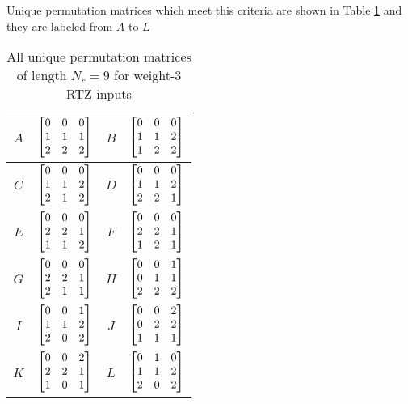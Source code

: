 \documentclass[11pt, oneside, dvipdfmx]{book}
\begin{document}
Unique permutation matrices which meet this criteria are shown in Table \ref{tb2} and they are labeled from $A$ to $L$

\begin{table}[h!]
\centering
\begin{tabular}{|c || c  |c  ||c  |} 
 \hline
 $A$ & $\begin{bmatrix} 0 & 0 & 0 \cr 1 & 1 & 1 \cr 2 & 2 & 2\end{bmatrix}$ 
  &
 $B$ & $\begin{bmatrix}0 & 0 & 0 \cr 1 & 1 & 2 \cr 1 & 2 & 2\end{bmatrix}$\\ 
 \hline
$C$ & $\begin{bmatrix}0 & 0 & 0 \cr 1 & 1 & 2 \cr 2 & 1 & 2\end{bmatrix}$ 
 &
$D$ & $\begin{bmatrix}0 & 0 & 0 \cr 1 & 1 & 2 \cr 2 & 2 & 1\end{bmatrix}$\\ 
 \hline
 $E$ & $\begin{bmatrix}0 & 0 & 0 \cr 2 & 2 & 1 \cr 1 & 1 & 2\end{bmatrix}$ 
 &
 $F$ & $\begin{bmatrix}0 & 0 & 0 \cr 2 & 2 & 1 \cr 1 & 2 & 1\end{bmatrix}$\\ 
 \hline
 $G$ & $\begin{bmatrix}0 & 0 & 0 \cr 2 & 2 & 1 \cr 2 & 1 & 1\end{bmatrix}$ 
 &
  $H$ & $\begin{bmatrix}0 & 0 & 1 \cr 0 & 1 & 1 \cr 2 & 2 & 2\end{bmatrix}$\\ 
 \hline
  $I$ & $\begin{bmatrix}0 & 0 & 1 \cr 1 & 1 & 2 \cr 2 & 0 & 2\end{bmatrix}$ 
 &
 $J$ & $\begin{bmatrix}0 & 0 & 2 \cr 0 & 2 & 2 \cr 1 & 1 & 1\end{bmatrix}$\\ 
 \hline
  $K$ & $\begin{bmatrix}0 & 0 & 2 \cr 2 & 2 & 1 \cr 1 & 0 & 1\end{bmatrix}$
 &
  $L$ & $\begin{bmatrix}0 & 1 & 0 \cr 1 & 1 & 2 \cr 2 & 0 & 2\end{bmatrix}$\\ 
 \hline
\end{tabular}
\caption{All unique permutation matrices of length $N_c =9$ for weight-$3$ RTZ inputs}
\label{tb2}
\end{table}
\end{document}
